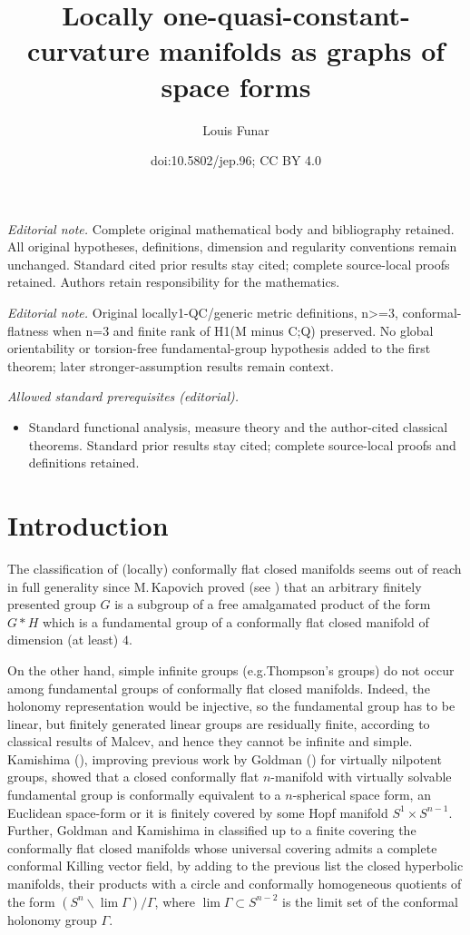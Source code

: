 \documentclass[10pt]{amsart}
\title{Locally one-quasi-constant-curvature manifolds as graphs of space forms}
\author{Louis Funar}
\date{doi:10.5802/jep.96; CC BY 4.0}
\let\moins\smallsetminus
\theoremstyle{definition}
\theoremstyle{remark}
\numberwithin{equation}{section}
\providecommand{\eg}{e.g.}\providecommand{\ie}{i.e.}\providecommand{\etc}{etc.}\providecommand{\resp}{resp.}\providecommand{\cf}{cf.}
\providecommand{\mainmatter}{}\providecommand{\backmatter}{}
\begin{document}
\maketitle
\noindent\textit{Editorial note.} Complete original mathematical body and bibliography retained. All original hypotheses, definitions, dimension and regularity conventions remain unchanged. Standard cited prior results stay cited; complete source-local proofs retained. Authors retain responsibility for the mathematics.\par\medskip
\noindent\textit{Editorial note.} Original locally1-QC/generic metric definitions, n>=3, conformal-flatness when n=3 and finite rank of H1(M minus C;Q) preserved. No global orientability or torsion-free fundamental-group hypothesis added to the first theorem; later stronger-assumption results remain context.\par\medskip
\noindent\textit{Allowed standard prerequisites (editorial).}\begin{itemize}
\item Standard functional analysis, measure theory and the author-cited classical theorems. Standard prior results stay cited; complete source-local proofs and definitions retained.
\end{itemize}\medskip
\vspace*{-\baselineskip}%
\tableofcontents
\vspace*{-2\baselineskip}%
\mainmatter

\section{Introduction}
The classification of (locally) conformally flat closed manifolds
seems out of reach in full generality since M.\,Kapovich proved (see \cite{Ka})
that an arbitrary finitely presented group $G$ is a subgroup
of a free amalgamated product of the form
$G * H$ which is a fundamental group of a conformally
flat closed manifold of dimension (at least) $4$.

On the other hand, simple infinite groups (\eg Thompson's groups) do not occur
among fundamental groups of conformally flat closed manifolds. Indeed, the holonomy
representation would be injective, so the fundamental group has to be linear, but finitely generated
linear groups are residually finite, according to classical results of Malcev, and hence they cannot be infinite and simple.
Kamishima (\cite{Kam}), improving previous work by
Goldman (\cite{Go}) for virtually nilpotent groups, showed that a closed conformally flat
$n$-manifold with virtually solvable
fundamental group is conformally equivalent to a
$n$-spherical space form, an Euclidean space-form or it is
finitely covered by some Hopf manifold
$S^1\times S^{n-1}$. Further, Goldman and Kamishima in
\cite{Go-Kam} classified up to a finite covering the conformally flat closed manifolds whose universal covering
admits a complete conformal Killing
vector field, by adding to the previous list the closed
hyperbolic manifolds, their products with a circle
and conformally homogeneous quotients of the form
$(S^n\moins\lim \Gamma)/\Gamma$, where
$\lim \Gamma\subset S^{n-2}$ is the limit set of the conformal
holonomy group $\Gamma$.
\end{document}

